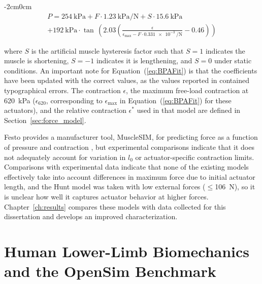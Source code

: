 \begin{adjustwidth}{-2cm}{0cm}
\begin{multline}
P = \qty{254}{\kPa} + F \cdot \qty{1.23}{\kPa\per\newton} + S \cdot \qty{15.6}{\kPa} \\ + \qty{192}{\kPa} \cdot \tan\,\left( 2.03 \left( \frac{\epsilon}{\epsilon_{\max} - F \cdot \qty{0.331e-3}{\per\newton}} - 0.46 \right) \right) \label{eq:BPAFit}
\end{multline}
\end{adjustwidth}

\noindent
where $S$ is the artificial muscle hysteresis factor such that $S=1$ indicates the muscle is shortening, $S=-1$ indicates it is lengthening, and $S=0$ under static conditions. An important note for Equation~(\ref{eq:BPAFit}) is that the coefficients have been updated with the correct values, as the values reported in \citet{hunt_modeling_2017} contained typographical errors. The contraction $\epsilon$, the maximum free-load contraction at \qty{620}{\kPa} ($\epsilon_{620}$, corresponding to $\epsilon_{\max}$ in Equation~(\ref{eq:BPAFit}) for these actuators), and the relative contraction $\epsilon^*$ used in that model are defined in Section~\ref{sec:force_model}.

Festo provides a manufacturer tool, MuscleSIM, for predicting force as a function of pressure and contraction \citep{lang_robert_musclesim_2005}, but experimental comparisons indicate that it does not adequately account for variation in $l_0$ or actuator-specific contraction limits. Comparisons with experimental data indicate that none of the existing models effectively take into account differences in maximum force due to initial actuator length, and the Hunt model was taken with low external forces ($\leq$\qty{106}{\newton}), so it is unclear how well it captures actuator behavior at higher forces. Chapter~\ref{ch:results} compares these models with data collected for this dissertation and develops an improved characterization.

\section{Human Lower-Limb Biomechanics and the OpenSim Benchmark}\label{sec:bg_biomechanics}

